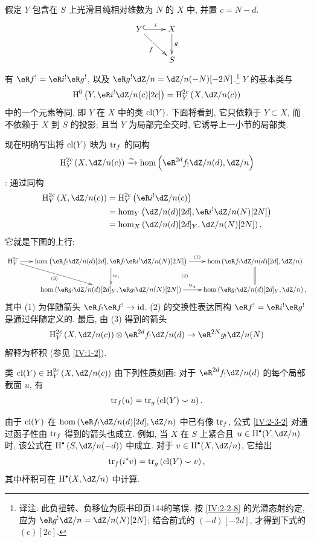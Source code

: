 假定 $Y$ 包含在 $S$ 上光滑且纯相对维数为 $N$ 的 $X$ 中, 并置 $c=N-d$.
\[\xymatrix{
  Y \ar@{^{(}->}[r]^-i \ar[dr]_-f
    & X \ar[d]^-g \\
  & S
}\]
有 $\eR f^! = \eR i^!\eR g^!$, 以及
$\eR g^! \dZ/n=\dZ/n(-N)[-2 N]$.\footnote{译注: 此负扭转、负移位为原书印页144的笔误. 按 \ref{IV:2-2-8} 的光滑态射约定, 应为 $\eR g^!\dZ/n=\dZ/n(N)[2N]$; 结合前式的 $(-d)[-2d]$, 才得到下式的 $(c)[2c]$.}
$Y$ 的基本类与
\[
  \h^0\left(Y,\eR i^!\dZ/n(c)[2 c]\right)=\h_Y^{2 c}\left(X,\dZ/n(c)\right)
\]
中的一个元素等同, 即 $Y$ 在 $X$ 中的类 $\operatorname{cl}(Y)$.
下面将看到, 它只依赖于 $Y\subset X$, 而不依赖于 $X$ 到 $S$ 的投影;
且当 $Y$ 为局部完全交时, 它诱导上一小节的局部类.

现在明确写出将 $\operatorname{cl}(Y)$ 映为 $\operatorname{tr}_f$ 的同构
\[
  \h_Y^{2 c}\left(X,\dZ/n(c)\right) \iso \hom\left(\eR^{2 d}f_!\dZ/n(d),\dZ/n\right)
\]
: 通过同构
\begin{align*}
  \h_Y^{2 c}\left(X,\dZ/n(c)\right)
    &= \h_Y^{2 c}\left(\eR i^!\dZ/n(c)\right) \\
    &= \hom_Y\left(\dZ/n(d)[2 d],\eR i^!\dZ/n(N)[2 N]\right) \\
    &= \hom_X\left(\dZ/n(d)[2 d]_Y,\dZ/n(N)[2 N]\right) \text{,}
\end{align*}
它就是下图的上行:
\[\xymatrix@C=1.8em{
  \h_Y^{2 c} \ar[r] \ar[dr]_-{(3)}
    & \hom\left(\eR f_!\dZ/n(d)[2 d],\eR f_! \eR i^!\dZ/n(N)[2 N]\right) \ar[r]^-{(1)} \ar[d]^-{\tr_i} \ar@{}[dr]|-{(2)}
    & \hom\left(\eR f_!\dZ/n(d)[2d],\dZ/n\right) \ar@{=}[d] \\
  & \hom\left(\eR g_!\dZ/n(d)[2 d]_Y,\eR g_!\dZ/n(N)[2 N]\right) \ar[r]^-{\tr_g}
    & \hom\left(\eR g_!\dZ/n(d)[2 d]_Y,\dZ/n\right) \text{,}
}\]
其中 (1) 为伴随箭头 $\eR f_!\eR f^!\to \text{id}$.
(2) 的交换性表达同构 $\eR f^!=\eR i^!\eR g^!$ 是通过伴随定义的.
最后, 由 (3) 得到的箭头
\[
  \h_Y^{2c}\left(X,\dZ/n(c)\right) \otimes \eR^{2 d} f_!\dZ/n(d) \to \eR^{2 N} g_!\dZ/n(N)
\]
解释为杯积 (参见 \ref{IV:1-2}).

\begin{definition}\label{IV:2-3-2}
类 $\cl(Y)\in\h_Y^{2 c}\left(X,\dZ/n(c)\right)$ 由下列性质刻画:
对于 $\eR^{2 d}f_! \dZ/n(d)$ 的每个局部截面 $u$, 有
\[
  \operatorname{tr}_f(u) = \operatorname{tr}_g\left(\operatorname{cl}(Y)\smallsmile u\right) \text{.}
\]
\end{definition}

由于 $\operatorname{cl}(Y)$ 在
$\hom\left(\eR f_!\dZ/n(d)[2 d],\dZ/n\right)$ 中已有像 $\operatorname{tr}_f$,
公式 \ref{IV:2-3-2} 对通过函子性由 $\operatorname{tr}_f$ 得到的箭头也成立.
例如, 当 $X$ 在 $S$ 上紧合且 $u\in \h^\bullet(Y,\dZ/n)$ 时,
该公式在 $\h^\bullet\left(S,\dZ/n(-d)\right)$ 中成立.
对于 $v\in \h^\bullet(X,\dZ/n)$, 它给出
\[
  \operatorname{tr}_f(i^* v) = \operatorname{tr}_g\left(\operatorname{cl}(Y)\smallsmile v\right) \text{,}
\]
其中杯积可在 $\h^\bullet(X,\dZ/n)$ 中计算.


